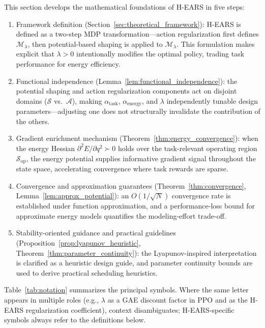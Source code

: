 \documentclass[journal]{IEEEtran}
\begin{document}
	This section develops the mathematical foundations of H-EARS in five steps:
	\begin{enumerate}
		\item Framework definition (Section~\ref{sec:theoretical_framework}): H-EARS is defined as a two-step MDP transformation---action regularization first defines $\mathcal{M}_\lambda$, then potential-based shaping is applied to $\mathcal{M}_\lambda$. This formulation makes explicit that $\lambda > 0$ intentionally modifies the optimal policy, trading task performance for energy efficiency.
		\item Functional independence (Lemma~\ref{lem:functional_independence}): the potential shaping and action regularization components act on disjoint domains ($\mathcal{S}$ vs.\ $\mathcal{A}$), making $\alpha_{\text{task}}$, $\alpha_{\text{energy}}$, and $\lambda$ independently tunable design parameters---adjusting one does not structurally invalidate the contribution of the others.
		\item Gradient enrichment mechanism (Theorem~\ref{thm:energy_convergence}): when the energy Hessian $\partial^2 E/\partial q^2 \succ 0$ holds over the task-relevant operating region $\mathcal{S}_{\text{op}}$, the energy potential supplies informative gradient signal throughout the state space, accelerating convergence where task rewards are sparse.
		\item Convergence and approximation guarantees (Theorem~\ref{thm:convergence}, Lemma~\ref{lem:approx_potential}): an $O(1/\sqrt{N})$ convergence rate is established under function approximation, and a performance-loss bound for approximate energy models quantifies the modeling-effort trade-off.
		\item Stability-oriented guidance and practical guidelines (Proposition~\ref{prop:lyapunov_heuristic}, Theorem~\ref{thm:parameter_continuity}): the Lyapunov-inspired interpretation is clarified as a heuristic design guide, and parameter continuity bounds are used to derive practical scheduling heuristics.
	\end{enumerate}
	Table~\ref{tab:notation} summarizes the principal symbols. Where the same letter appears in multiple roles (e.g., $\lambda$ as a GAE discount factor in PPO and as the H-EARS regularization coefficient), context disambiguates; H-EARS-specific symbols always refer to the definitions below.
	
\end{document}
